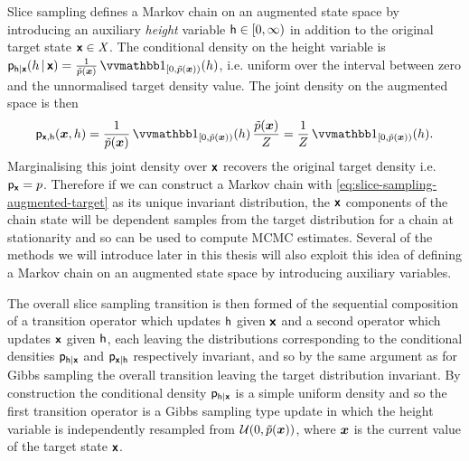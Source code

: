 Slice sampling defines a Markov chain on an augmented state space by introducing an auxiliary \emph{height} variable $\mathsf{h} \in [0, \infty)$ in addition to the original target state $\boldsymbol{\mathsf{x}} \in \mathit{X}$. The conditional density on the height variable is $\pden{\rvar{h}|\rvct{x}}(h\gvn\rvct{x}) = \frac{1}{\utgtdens(\vct{x})} \ind{[0,\utgtdens(\vct{x}))}(h) $, i.e. uniform over the interval between zero and the unnormalised target density value. The joint density on the augmented space is then
\begin{equation}\label{eq:slice-sampling-augmented-target}
  \pden{\rvct{x},\rvar{h}}(\vct{x},h) = 
  \frac{1}{\utgtdens(\vct{x})} \ind{[0,\utgtdens(\vct{x}))}(h)\, \frac{\utgtdens(\vct{x})}{Z} =
  \frac{1}{Z} \ind{[0,\utgtdens(\vct{x}))}(h).
\end{equation}
Marginalising this joint density over $\boldsymbol{\mathsf{x}}$ recovers the original target density i.e. $\mathsf{p}_{\boldsymbol{\mathsf{x}}} = p$. Therefore if we can construct a Markov chain with \eqref{eq:slice-sampling-augmented-target} as its unique invariant distribution, the $\boldsymbol{\mathsf{x}}$ components of the chain state will be dependent samples from the target distribution for a chain at stationarity and so can be used to compute \ac{MCMC} estimates. Several of the methods we will introduce later in this thesis will also exploit this idea of defining a Markov chain on an augmented state space by introducing auxiliary variables.

The overall slice sampling transition is then formed of the sequential composition of a transition operator which updates $\mathsf{h}$ given $\boldsymbol{\mathsf{x}}$ and a second operator which updates $\boldsymbol{\mathsf{x}}$ given $\mathsf{h}$, each leaving the distributions corresponding to the conditional densities $\mathsf{p}_{\mathsf{h}|\boldsymbol{\mathsf{x}}}$ and $\mathsf{p}_{\boldsymbol{\mathsf{x}}|\mathsf{h}}$ respectively invariant, and so by the same argument as for Gibbs sampling the overall transition leaving the target distribution invariant. By construction the conditional density $\mathsf{p}_{\mathsf{h}|\boldsymbol{\mathsf{x}}}$ is a simple uniform density and so the first transition operator is a Gibbs sampling type update in which the height variable is independently resampled from $\mathcal{U}\lpa 0, \utgtdens(\vct{x})\rpa$, where $\boldsymbol{x}$ is the current value of the target state $\boldsymbol{\mathsf{x}}$.

